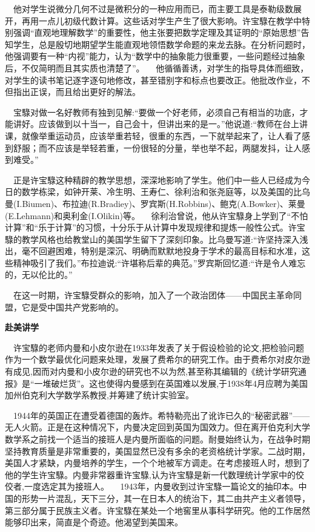 \documentclass[a4paper,AutoFakeBold,oneside,12pt]{article}
\begin{document}
$\quad$他对学生说微分几何不过是微积分的一种应用而已，而主要工具是泰勒级数展开，再用一点儿初级代数计算。这些话对学生产生了很大影响。许宝騄在教学中特别强调“直观地理解数学”的重要性，他主张要把数学定理及其证明的“原始思想”告知学生，总是殷切地期望学生能直观地领悟数学命题的来龙去脉。在分析问题时，他强调要有一种“内视”能力，认为“数学中的抽象能力很重要，一些问题经过抽象后，不仅简明而且其实质也清楚了”。
	$\quad$他循循善诱，对学生的指导具体而细致，对学生的读书笔记逐字逐句地修改，甚至错别字和标点也要改正。他批改作业，不但指出正误，而且给出更好的解法。

$\quad$宝騄对做一名好教师有独到见解:“要做一个好老师，必须自己有相当的功底，才能讲好。应该做到以十当一，自己会十，但讲出来的是一。”他说道:“教师在台上讲课，就像举重运动员，应该举重若轻，很重的东西，一下就举起来了，让人看了感到舒服；而不应该是举轻若重，一份很轻的分量，举也举不起，两腿发抖，让人感到难受。”

$\quad$正是许宝騄这种精辟的教学思想，深深地影响了学生。他们中一些人已经成为今日的数学栋梁，如钟开莱、冷生明、王寿仁、徐利治和张尧庭等，以及美国的比乌曼(I.Biumen)、布拉迪(R.Bradiey)、罗宾斯(H.Robbins)、鲍克(A.Bowker)、莱曼(E.Lehmann)和奥利金(I.Olikin)等。
	$\quad$徐利治曾说，他从许宝騄身上学到了“不怕计算”和“乐于计算”的习惯，十分乐于从计算中发现规律和提炼一般性公式。许宝騄的教学风格也给教堂山的美国学生留下了深刻印象。比乌曼写道:“许坚持深入浅出，毫不回避困难，特别是深沉、明确而默默地投身于学术的最高目标和水准，这些精神吸引了我们。”布拉迪说:“许堪称后辈的典范。”罗宾斯回忆道:“许是令人难忘的，无以伦比的。” 

$\quad$在这一时期，许宝騄受群众的影响，加入了一个政治团体——中国民主革命同盟，它是受中国共产党影响的。

	\textbf{赴美讲学}

$\quad$许宝騄的老师内曼和小皮尔逊在1933年发表了关于假设检验的论文,把检验问题作为一个数学最优化问题来处理，发展了费希尔的研究工作。由于费希尔对皮尔逊有成见,因而对内曼和小皮尔逊的研究也不以为然,甚至称其编辑的《统计学研究通报》是“一堆破烂货”。这也使得内曼感到在英国难以发展,于1938年4月应聘为美国加州伯克利大学数学系教授,并筹建了统计实验室。

$\quad$1944年的英国正在遭受着德国的轰炸。希特勒亮出了讹诈已久的“秘密武器”——无人火箭。正是在这种情况下，内曼决定回到英国为国效力。但在离开伯克利大学数学系之前找一个适当的接班人是内曼所面临的问题。耐曼始终认为，在战争时期坚持教育质量是非常重要的，美国显然已没有多余的老资格统计学家。二战时期，美国人才紧缺，内曼培养的学生，一个个地被军方调走。在考虑接班人时，想到了他的学生许宝騄。内曼非常器重许宝騄,认为许宝騄是新一代数理统计学家中的佼佼者,一度选定其为接班人。
	$\quad$1943年，内曼收到过许宝騄一篇论文的抽印本。中国的形势一片混乱，天下三分，其一在日本人的统治下，其二由共产主义者领导，第三部分属于民族主义者。许宝騄在某处一个地窖里从事科学研究。他的工作居然能够印出来，简直是个奇迹。他渴望到美国来。
\end{document}
